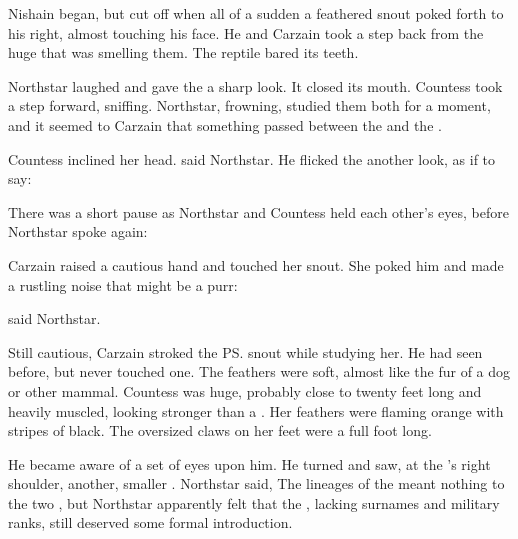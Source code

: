 \begin{comment}
\subsubsection{Nycans}
\end{comment}

Nishain began, but cut off when all of a sudden a feathered snout poked forth to his right, almost touching his face. 
He and Carzain took a step back from the huge \nycan{} that was smelling them. 
The reptile bared its teeth. 

Northstar laughed and gave the \nycan{} a sharp look. 
It closed its mouth. 
Countess took a step forward, sniffing. Northstar, frowning, studied them both for a moment, and it seemed to Carzain that something passed between the \scatha{} and the \nycan. 

Countess inclined her head. 
 said Northstar. 
He flicked the \nycan{} another look, as if to say: 

There was a short pause as Northstar and Countess held each other's eyes, before Northstar spoke again: 

Carzain raised a cautious hand and touched her snout. 
She poked him and made a rustling noise that might be a purr:

 said Northstar. 

Still cautious, Carzain stroked the \ps{\nycan}{} snout while studying her. 
He had seen \nycans{} before, but never touched one. 
The feathers were soft, almost like the fur of a dog or other mammal. 
Countess was huge, probably close to twenty feet long and heavily muscled, looking stronger than a \relc. 
Her feathers were flaming orange with stripes of black. 
The oversized claws on her feet were a full foot long. 

He became aware of a set of eyes upon him. 
He turned and saw, at the \IlcSR{}'s right shoulder, another, smaller \nycan. 
 Northstar said, 
The lineages of the \nycans{} meant nothing to the two \humans, but Northstar apparently felt that the \nycans, lacking surnames and military ranks, still deserved some formal introduction. 

